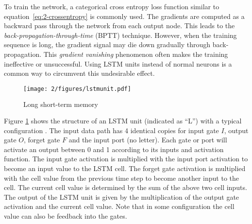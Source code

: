 To train the network, a categorical cross entropy loss function similar to equation~\ref{eq:2-crossentropy} is commonly used. The gradients are computed as a backward pass through the network from each output node. This leads to the {\it back-propagation-through-time} (BPTT) \cite{rumelhart1988parallel,werbos1990backpropagation} technique. However, when the training sequence is long, the gradient signal may die down gradually through back-propagation. This {\it gradient vanishing} \cite{bengio2009learning} phenomenon often makes the training ineffective or unsuccessful. Using LSTM units \cite{hochreiter1997long} instead of normal neurons is a common way to circumvent this undesirable effect.

\begin{figure}[htb]
\centering
\texttt{[image: 2/figures/lstmunit.pdf]}
\caption{Long short-term memory}
\label{fig:2-lstmunit}
\end{figure}
Figure \ref{fig:2-lstmunit} shows the structure of an LSTM unit (indicated as ``L'') with a typical configuration \cite{graves2012supervised}. The input data path has 4 identical copies for input gate $I$, output gate $O$, forget gate $F$ and the input port (no letter). Each gate or port will activate an output between 0 and 1 according to its inputs and activation function. The input gate activation is multiplied with the input port activation to become an input value to the LSTM cell. The forget gate activation is multiplied with the cell value from the previous time step to become another input to the cell. The current cell value is determined by the sum of the above two cell inputs. The output of the LSTM unit is given by the multiplication of the output gate activation and the current cell value. Note that in some configuration the cell value can also be feedback into the gates.

